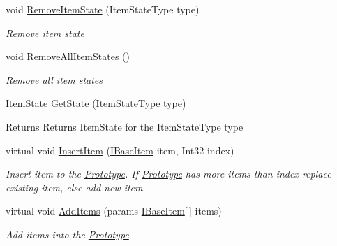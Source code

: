 \begin{DoxyCompactItemize}
void \mbox{\hyperlink{class_space_v_i_l_1_1_prototype_a2c7109a2346956afe3e03958e6d2701c}{Remove\+Item\+State}} (Item\+State\+Type type)
\begin{DoxyCompactList}\small\item\em Remove item state \end{DoxyCompactList}\item 
void \mbox{\hyperlink{class_space_v_i_l_1_1_prototype_ac5b68167a1e8160c1af3033f94e80858}{Remove\+All\+Item\+States}} ()
\begin{DoxyCompactList}\small\item\em Remove all item states \end{DoxyCompactList}\item 
\mbox{\label{class_space_v_i_l_1_1_prototype_a6d80da4133973f688c951beb724ad862}} 
\mbox{\hyperlink{class_space_v_i_l_1_1_decorations_1_1_item_state}{Item\+State}} \mbox{\hyperlink{class_space_v_i_l_1_1_prototype_a6d80da4133973f688c951beb724ad862}{Get\+State}} (Item\+State\+Type type)
\begin{DoxyCompactList}\small\item\em \begin{DoxyReturn}{Returns}
Returns Item\+State for the Item\+State\+Type type 
\end{DoxyReturn}
\end{DoxyCompactList}\item 
virtual void \mbox{\hyperlink{class_space_v_i_l_1_1_prototype_a9dd004dfa4ca2ea37c21770a24434270}{Insert\+Item}} (\mbox{\hyperlink{interface_space_v_i_l_1_1_core_1_1_i_base_item}{I\+Base\+Item}} item, Int32 index)
\begin{DoxyCompactList}\small\item\em Insert item to the \mbox{\hyperlink{class_space_v_i_l_1_1_prototype}{Prototype}}. If \mbox{\hyperlink{class_space_v_i_l_1_1_prototype}{Prototype}} has more items than index replace existing item, else add new item \end{DoxyCompactList}\item 
virtual void \mbox{\hyperlink{class_space_v_i_l_1_1_prototype_a41f1a65df4f13b958dfdab342266a357}{Add\+Items}} (params \mbox{\hyperlink{interface_space_v_i_l_1_1_core_1_1_i_base_item}{I\+Base\+Item}}\mbox{[}$\,$\mbox{]} items)
\begin{DoxyCompactList}\small\item\em Add items into the \mbox{\hyperlink{class_space_v_i_l_1_1_prototype}{Prototype}} \end{DoxyCompactList}\item 

\end{DoxyCompactItemize}
